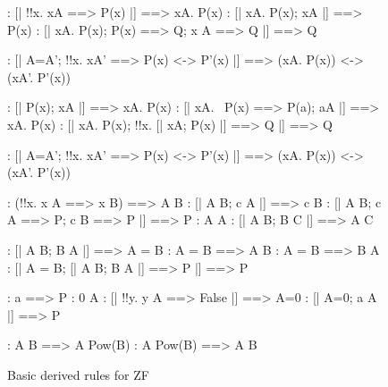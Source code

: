\begin{figure}
\begin{alltt*}\isastyleminor
{}:     [| !!x. x\isasymin{}A ==> P(x) |] ==> {\isasymforall}x\isasymin{}A. P(x)
:     [| {\isasymforall}x\isasymin{}A. P(x);  x\isasymin{}A |] ==> P(x)
:     [| {\isasymforall}x\isasymin{}A. P(x);  P(x) ==> Q;  x \isasymnotin A ==> Q |] ==> Q

:  [| A=A';  !!x. x\isasymin{}A' ==> P(x) <-> P'(x) |] ==> 
             ({\isasymforall}x\isasymin{}A. P(x)) <-> ({\isasymforall}x\isasymin{}A'. P'(x))

:      [| P(x);  x\isasymin{}A |] ==> {\isasymexists}x\isasymin{}A. P(x)
:     [| {\isasymforall}x\isasymin{}A. ~P(x) ==> P(a);  a\isasymin{}A |] ==> {\isasymexists}x\isasymin{}A. P(x)
:      [| {\isasymexists}x\isasymin{}A. P(x);  !!x. [| x\isasymin{}A; P(x) |] ==> Q |] ==> Q

:  [| A=A';  !!x. x\isasymin{}A' ==> P(x) <-> P'(x) |] ==> 
             ({\isasymexists}x\isasymin{}A. P(x)) <-> ({\isasymexists}x\isasymin{}A'. P'(x))

:     (!!x. x \isasymin A ==> x \isasymin B) ==> A \isasymsubseteq B
:     [| A \isasymsubseteq B;  c \isasymin A |] ==> c \isasymin B
:    [| A \isasymsubseteq B;  c \isasymnotin A ==> P;  c \isasymin B ==> P |] ==> P
:  A \isasymsubseteq A
: [| A \isasymsubseteq B;  B \isasymsubseteq C |] ==> A \isasymsubseteq C

:   [| A \isasymsubseteq B;  B \isasymsubseteq A |] ==> A = B
:  A = B ==> A \isasymsubseteq B
:  A = B ==> B \isasymsubseteq A
:   [| A = B;  [| A \isasymsubseteq B; B \isasymsubseteq A |] ==> P |]  ==>  P

:        a  ==> P
:  0 \isasymsubseteq A
:      [| !!y. y \isasymin A ==> False |] ==> A=0
:      [| A=0;  a \isasymin A |] ==> P

:          A \isasymsubseteq B ==> A \isasymin Pow(B)
:          A \isasymin Pow(B)  ==>  A \isasymsubseteq B
\end{alltt*}
\caption{Basic derived rules for ZF} \label{zf-lemmas1}
\end{figure}


